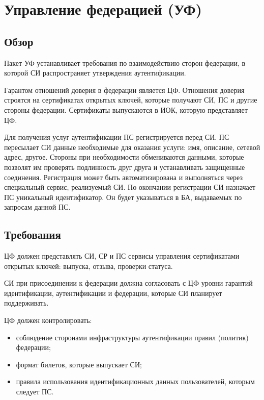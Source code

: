 \section{Управление федерацией (УФ)}\label{FM}

\subsection{Обзор}\label{FM.Intro}

Пакет УФ устанавливает требования по взаимодействию сторон федерации, в которой 
СИ распространяет утверждения аутентификации. 

Гарантом отношений доверия в федерации является ЦФ.
Отношения доверия строятся на сертификатах открытых ключей,
которые получают СИ, ПС и другие стороны федерации.
%
Сертификаты выпускаются в ИОК, которую представляет ЦФ.

Для получения услуг аутентификации ПС регистрируется перед СИ.
%
ПС пересылает СИ данные необходимые для оказания услуги: имя, описание, сетевой
адрес, другое. Стороны при необходимости обмениваются данными, которые позволят
им проверять подлинность друг друга и устанавливать защищенные соединения.
%
Регистрация может быть автоматизирована и выполняться через специальный сервис,
реализуемый СИ.
%
По окончании регистрации СИ назначает ПС уникальный идентификатор. Он будет 
указываться в БА, выдаваемых по запросам данной ПС.

\subsection{Требования}\label{FM.Reqs}


ЦФ должен представлять СИ, СР и ПС сервисы управления сертификатами открытых 
ключей: выпуска, отзыва, проверки статуса. 

СИ при присоединении к федерации должна согласовать с ЦФ уровни гарантий 
идентификации, аутентификации и федерации, которые СИ планирует поддерживать.

ЦФ должен контролировать:
\begin{itemize}
\item
соблюдение сторонами инфраструктуры аутентификации правил (политик) федерации;
\item
формат билетов, которые выпускает СИ;
\item
правила использования идентификационных данных пользователей, которым следует ПС.
\end{itemize}

